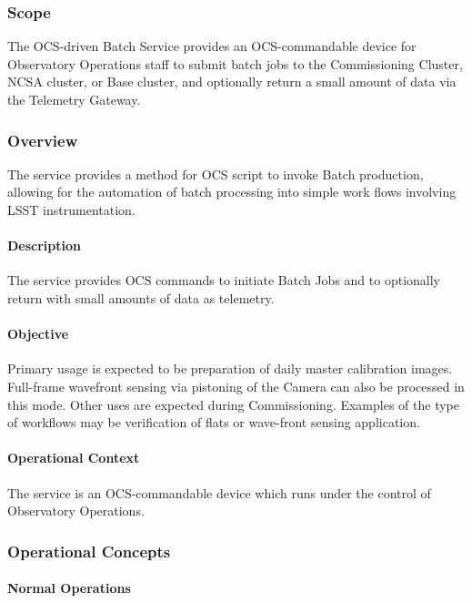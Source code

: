 \subsubsection{Scope}

The OCS-driven Batch Service provides an OCS-commandable device for Observatory
Operations staff to submit batch jobs to the Commissioning Cluster, NCSA cluster, or Base cluster, and optionally return a small amount of data via the Telemetry Gateway.

\subsubsection{Overview}

The service provides a method for OCS script to invoke Batch
production, allowing for the automation of batch processing into simple work
flows involving LSST instrumentation.


\paragraph{Description}

The service provides OCS commands to initiate Batch Jobs and to optionally
return with small amounts of data as telemetry.

\paragraph{Objective}

Primary usage is expected to be preparation of daily master calibration images.  Full-frame wavefront sensing via pistoning of the Camera can also be processed in this mode.  Other uses are expected during Commissioning.  Examples of the type of workflows may be verification of flats or wave-front sensing application.


\paragraph{Operational Context}

The service is an OCS-commandable device which runs under the control of
Observatory  Operations.

\subsubsection{Operational Concepts}

\paragraph{Normal Operations}

